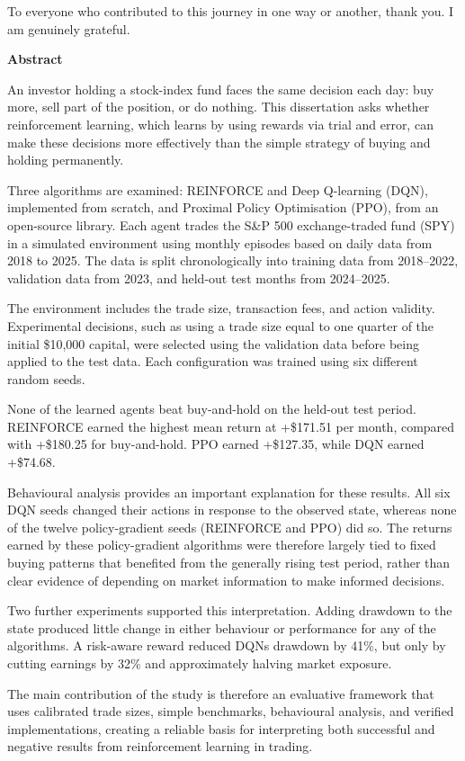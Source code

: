 To everyone who contributed to this journey in one way or another, thank
you. I am genuinely grateful.

\textbf{Abstract}

An investor holding a stock-index fund faces the same decision each day:
buy more, sell part of the position, or do nothing. This dissertation
asks whether reinforcement learning, which learns by using rewards via
trial and error, can make these decisions more effectively than the
simple strategy of buying and holding permanently.

Three algorithms are examined: REINFORCE and Deep Q-learning (DQN),
implemented from scratch, and Proximal Policy Optimisation (PPO), from
an open-source library. Each agent trades the S\&P 500 exchange-traded
fund (SPY) in a simulated environment using monthly episodes based on
daily data from 2018 to 2025. The data is split chronologically into
training data from 2018--2022, validation data from 2023, and held-out
test months from 2024--2025.

The environment includes the trade size, transaction fees, and action
validity. Experimental decisions, such as using a trade size equal to
one quarter of the initial \$10,000 capital, were selected using the
validation data before being applied to the test data. Each
configuration was trained using six different random seeds.

None of the learned agents beat buy-and-hold on the held-out test
period. REINFORCE earned the highest mean return at +\$171.51 per month,
compared with +\$180.25 for buy-and-hold. PPO earned +\$127.35, while
DQN earned +\$74.68.

Behavioural analysis provides an important explanation for these
results. All six DQN seeds changed their actions in response to the
observed state, whereas none of the twelve policy-gradient seeds
(REINFORCE and PPO) did so. The returns earned by these policy-gradient
algorithms were therefore largely tied to fixed buying patterns that
benefited from the generally rising test period, rather than clear
evidence of depending on market information to make informed decisions.

Two further experiments supported this interpretation. Adding drawdown
to the state produced little change in either behaviour or performance
for any of the algorithms. A risk-aware reward reduced
DQN\textquotesingle s drawdown by 41\%, but only by cutting earnings by
32\% and approximately halving market exposure.

The main contribution of the study is therefore an evaluative framework
that uses calibrated trade sizes, simple benchmarks, behavioural
analysis, and verified implementations, creating a reliable basis for
interpreting both successful and negative results from reinforcement
learning in trading.
